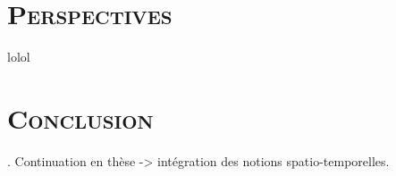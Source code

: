 \section{\scshape Perspectives}
\begin{frame}
	lolol
\end{frame}

\section{\scshape Conclusion}
\begin{frame}
	. Continuation en thèse -> intégration des notions spatio-temporelles.
	
	
\end{frame}